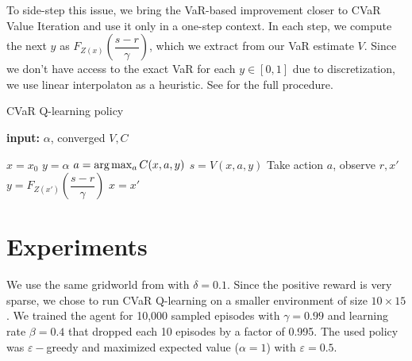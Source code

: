 To side-step this issue, we bring the VaR-based improvement closer to CVaR Value Iteration and use it only in a one-step context. In each step, we compute the next $y$ as $F_{Z(x)}(\dfrac{s-r}{\gamma})$, which we extract from our VaR estimate $V$. Since we don't have access to the exact VaR for each $y \in [0,1]$ due to discretization, we use linear interpolaton as a heuristic. See  for the full procedure.

\begin{algorithm}
\caption{CVaR Q-learning policy}\label{alg:varxibasedpolicy}
\begin{algorithmic}
    \STATE \textbf{input:} $\alpha$, converged $V, C$
    		
	\STATE $x = x_0$
	\STATE $y = \alpha$
	\STATE $a = \text{arg}\max_a C(x, a, y)$
	\STATE $s = V(x, a, y)$
	\STATE Take action $a$, observe $r, x'$
	\STATE $y = F_{Z(x')}(\dfrac{s-r}{\gamma})$
	\STATE $x = x'$
	\ENDWHILE
\end{algorithmic}
\end{algorithm}


%    
%		
%	


\newpage

\section{Experiments}\label{sec:qexperiments}
We use the same gridworld from  with $\delta=0.1$. Since the positive reward is very sparse, we chose to run CVaR Q-learning on a smaller environment of size $10\times15$. We trained the agent for 10,000 sampled episodes with $\gamma=0.99$ and learning rate $\beta=0.4$ that dropped each 10 episodes by a factor of 0.995. The used policy was $\varepsilon-$greedy and maximized expected value ($\alpha=1$) with $\varepsilon=0.5$.


